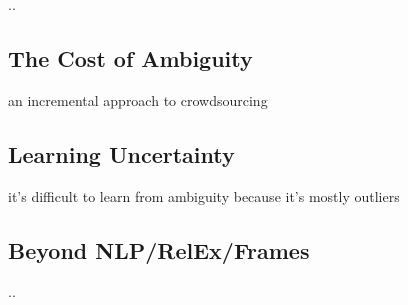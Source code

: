 ..



\subsection{The Cost of Ambiguity}

an incremental approach to crowdsourcing


\subsection{Learning Uncertainty}

it's difficult to learn from ambiguity because it's mostly outliers

\subsection{Beyond NLP/RelEx/Frames}

..

